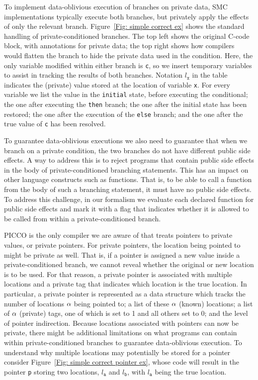 To implement data-oblivious execution of branches on private data, SMC implementations typically execute both branches, but privately apply the effects of only the relevant branch. Figure~\ref{Fig: simple correct ex} shows the standard handling of private-conditioned branches. 
The top left shows the original C-code block, with annotations for private data;  the top right shows how compilers would flatten the branch to hide the private data used in the condition. 
Here, the only variable modified within either branch is \texttt{c}, so we insert temporary variables to assist in tracking the results of both branches.
Notation $l_\texttt{x}$ in the table indicates the (private) value stored at the location of variable \texttt{x}. For every variable we list the value in the \texttt{initial} state, before executing the conditional; the one after executing the \texttt{then} branch; the one after the initial state has been restored; the one after the execution of the \texttt{else} branch; and the one after the true value of \texttt{c} has been resolved.


To guarantee data-oblivious executions we also need to guarantee that when we branch on a private condition, the two branches do not have different public side effects. A way to address this is to reject programs that contain public side effects in the body of private-conditioned branching statements. This has an impact on other language constructs such as functions. That is, to be able to call a function from the body of such a branching statement, it must have no public side effects. To address this challenge, in our formalism we evaluate each declared function for public side effects and mark it with a flag that indicates whether it is allowed to be called from within a private-conditioned branch.


PICCO is the only compiler we are aware of that treats pointers to private values, or private pointers.  For private pointers, the location being pointed to might be private as well. That is, if a pointer is assigned a new value inside a private-conditioned branch, we cannot reveal whether the original or new location is to be used. For that reason, a private pointer is associated with multiple locations and a private tag that indicates which location is the true location. In particular, a private pointer is represented as a data structure which tracks the number of locations $\alpha$ being pointed to; a list of these $\alpha$ (known) locations; a list of $\alpha$ (private) tags, one of which is set to 1 and all others set to 0; and the level of pointer indirection. Because locations associated with pointers can now be private, there might be additional limitations on what programs can contain within private-conditioned branches to guarantee data-oblivious execution. 
To understand why multiple locations may potentially be stored for a pointer consider Figure~\ref{Fig: simple correct pointer ex}, whose code will result in the pointer \texttt{p} storing two locations, $l_\texttt{a}$ and $l_\texttt{b}$, with $l_\texttt{a}$ being the true location.



